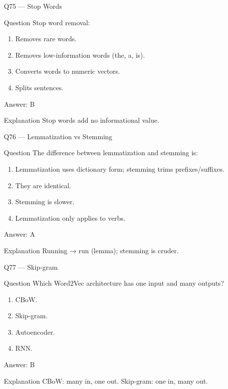 \documentclass[aspectratio=169,8pt]{beamer}
\begin{document}
	\begin{frame}{Q75 --- Stop Words}
		\begin{block}{Question}
			Stop word removal:
		\end{block}
		\begin{enumerate}
			\item Removes rare words.
			\item Removes low-information words (the, a, is).
			\item Converts words to numeric vectors.
			\item Splits sentences.
		\end{enumerate}
		\begin{exampleblock}{Answer: B}\end{exampleblock}
		\begin{block}{Explanation}
			Stop words add no informational value.
		\end{block}
	\end{frame}
	
	\begin{frame}{Q76 --- Lemmatization vs Stemming}
		\begin{block}{Question}
			The difference between lemmatization and stemming is:
		\end{block}
		\begin{enumerate}
			\item Lemmatization uses dictionary form; stemming trims prefixes/suffixes.
			\item They are identical.
			\item Stemming is slower.
			\item Lemmatization only applies to verbs.
		\end{enumerate}
		\begin{exampleblock}{Answer: A}\end{exampleblock}
		\begin{block}{Explanation}
			Running → run (lemma); stemming is cruder.
		\end{block}
	\end{frame}
	
	\begin{frame}{Q77 --- Skip-gram}
		\begin{block}{Question}
			Which Word2Vec architecture has one input and many outputs?
		\end{block}
		\begin{enumerate}
			\item CBoW.
			\item Skip-gram.
			\item Autoencoder.
			\item RNN.
		\end{enumerate}
		\begin{exampleblock}{Answer: B}\end{exampleblock}
		\begin{block}{Explanation}
			CBoW: many in, one out. Skip-gram: one in, many out.
		\end{block}
	\end{frame}
	
\end{document}
